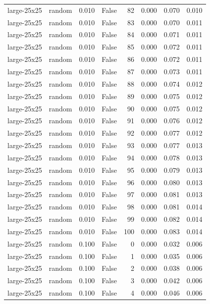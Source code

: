 \begin{tabular}{llrrrrrr}
large-25x25 & random & 0.010 & False & 82 & 0.000 & 0.070 & 0.010 \\
large-25x25 & random & 0.010 & False & 83 & 0.000 & 0.070 & 0.011 \\
large-25x25 & random & 0.010 & False & 84 & 0.000 & 0.071 & 0.011 \\
large-25x25 & random & 0.010 & False & 85 & 0.000 & 0.072 & 0.011 \\
large-25x25 & random & 0.010 & False & 86 & 0.000 & 0.072 & 0.011 \\
large-25x25 & random & 0.010 & False & 87 & 0.000 & 0.073 & 0.011 \\
large-25x25 & random & 0.010 & False & 88 & 0.000 & 0.074 & 0.012 \\
large-25x25 & random & 0.010 & False & 89 & 0.000 & 0.075 & 0.012 \\
large-25x25 & random & 0.010 & False & 90 & 0.000 & 0.075 & 0.012 \\
large-25x25 & random & 0.010 & False & 91 & 0.000 & 0.076 & 0.012 \\
large-25x25 & random & 0.010 & False & 92 & 0.000 & 0.077 & 0.012 \\
large-25x25 & random & 0.010 & False & 93 & 0.000 & 0.077 & 0.013 \\
large-25x25 & random & 0.010 & False & 94 & 0.000 & 0.078 & 0.013 \\
large-25x25 & random & 0.010 & False & 95 & 0.000 & 0.079 & 0.013 \\
large-25x25 & random & 0.010 & False & 96 & 0.000 & 0.080 & 0.013 \\
large-25x25 & random & 0.010 & False & 97 & 0.000 & 0.081 & 0.013 \\
large-25x25 & random & 0.010 & False & 98 & 0.000 & 0.081 & 0.014 \\
large-25x25 & random & 0.010 & False & 99 & 0.000 & 0.082 & 0.014 \\
large-25x25 & random & 0.010 & False & 100 & 0.000 & 0.083 & 0.014 \\
large-25x25 & random & 0.100 & False & 0 & 0.000 & 0.032 & 0.006 \\
large-25x25 & random & 0.100 & False & 1 & 0.000 & 0.035 & 0.006 \\
large-25x25 & random & 0.100 & False & 2 & 0.000 & 0.038 & 0.006 \\
large-25x25 & random & 0.100 & False & 3 & 0.000 & 0.042 & 0.006 \\
large-25x25 & random & 0.100 & False & 4 & 0.000 & 0.046 & 0.006 \\

\end{tabular}
